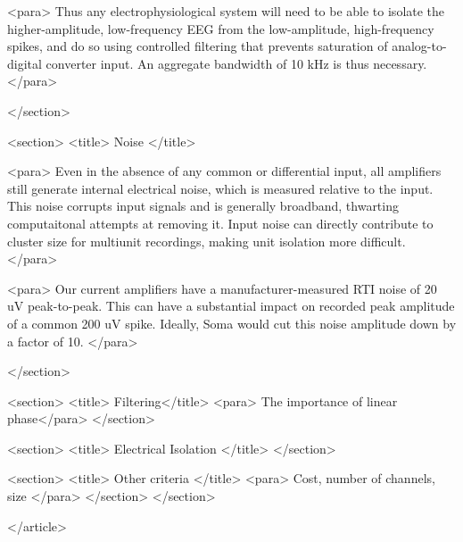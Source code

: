       <para> Thus any electrophysiological system will need to be able
      to isolate the higher-amplitude, low-frequency EEG from the
      low-amplitude, high-frequency spikes, and do so using controlled
      filtering that prevents saturation of analog-to-digital
      converter input. An aggregate bandwidth of 10 kHz is thus
      necessary. </para>

    </section>
    
    <section> 
      <title> Noise </title>
      
      <para> Even in the absence of any common or differential input,
      all amplifiers still generate internal electrical noise, which
      is measured relative to the input. This noise corrupts input
      signals and is generally broadband, thwarting computaitonal
      attempts at removing it. Input noise can directly contribute to
      cluster size for multiunit recordings, making unit isolation
      more difficult. </para> 

      <para> Our current amplifiers have a manufacturer-measured RTI
      noise of 20 uV peak-to-peak. This can have a substantial
      impact on recorded peak amplitude of a common 200 uV
      spike. Ideally, Soma would cut this noise amplitude down by a
      factor of 10. </para>

    </section>

    <section> 
      <title> Filtering</title>
      <para> The importance of linear phase</para>
    </section>

    <section>
      <title> Electrical Isolation </title>
    </section>

    <section>
      <title> Other criteria </title>
      <para>
	Cost, number of channels, size
      </para>
    </section>
    </section>

</article>

